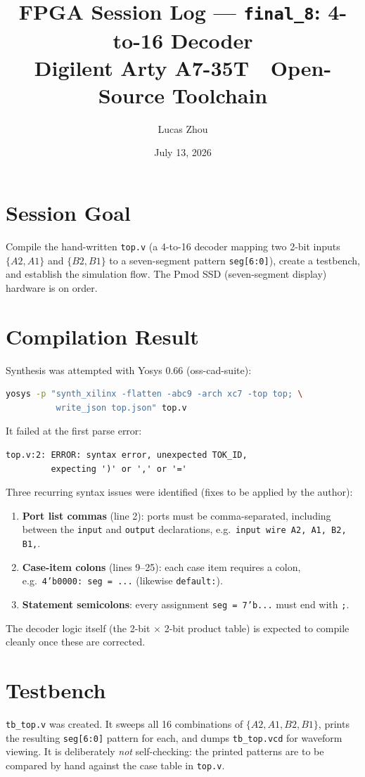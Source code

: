 \documentclass[11pt]{article}
\title{FPGA Session Log --- \texttt{final\_8}: 4-to-16 Decoder\\
\large Digilent Arty A7-35T \,\textperiodcentered\, Open-Source Toolchain}
\author{Lucas Zhou}
\date{July 13, 2026}
\begin{document}
\maketitle

\section{Session Goal}
Compile the hand-written \texttt{top.v} (a 4-to-16 decoder mapping two 2-bit
inputs $\{A2,A1\}$ and $\{B2,B1\}$ to a seven-segment pattern
\texttt{seg[6:0]}), create a testbench, and establish the simulation flow.
The Pmod SSD (seven-segment display) hardware is on order.

\section{Compilation Result}
Synthesis was attempted with Yosys 0.66 (oss-cad-suite):
\begin{lstlisting}[language=bash]
yosys -p "synth_xilinx -flatten -abc9 -arch xc7 -top top; \
          write_json top.json" top.v
\end{lstlisting}
It failed at the first parse error:
\begin{lstlisting}[language={}]
top.v:2: ERROR: syntax error, unexpected TOK_ID,
         expecting ')' or ',' or '='
\end{lstlisting}

Three recurring syntax issues were identified (fixes to be applied by the
author):
\begin{enumerate}
  \item \textbf{Port list commas} (line 2): ports must be comma-separated,
        including between the \texttt{input} and \texttt{output}
        declarations, e.g.\ \texttt{input wire A2, A1, B2, B1,}.
  \item \textbf{Case-item colons} (lines 9--25): each case item requires a
        colon, e.g.\ \texttt{4'b0000: seg = ...} (likewise
        \texttt{default:}).
  \item \textbf{Statement semicolons}: every assignment
        \texttt{seg = 7'b...} must end with \texttt{;}.
\end{enumerate}
The decoder logic itself (the 2-bit $\times$ 2-bit product table) is expected
to compile cleanly once these are corrected.

\section{Testbench}
\texttt{tb\_top.v} was created. It sweeps all 16 combinations of
$\{A2,A1,B2,B1\}$, prints the resulting \texttt{seg[6:0]} pattern for each,
and dumps \texttt{tb\_top.vcd} for waveform viewing. It is deliberately
\emph{not} self-checking: the printed patterns are to be compared by hand
against the case table in \texttt{top.v}.
\end{document}
